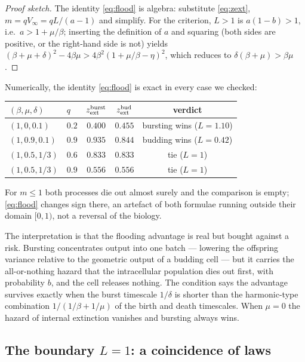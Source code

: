 \begin{proof}[Proof sketch]
The identity \eqref{eq:flood} is algebra: substitute \eqref{eq:zext},
$m=qV_\infty=qL/(a-1)$ and simplify. For the criterion, $L>1$ is
$a(1-b)>1$, i.e.\ $a>1+\mu/\beta$; inserting the definition of $a$ and
squaring (both sides are positive, or the right-hand side is not) yields
$(\beta+\mu+\delta)^2-4\beta\mu>4\beta^2(1+\mu/\beta-\eta)^2$, which
reduces to $\delta(\beta+\mu)>\beta\mu$.
\end{proof}

Numerically, the identity \eqref{eq:flood} is exact in every case we
checked:
\begin{center}
\renewcommand{\arraystretch}{1.2}
\begin{tabular}{@{}llccc@{}}
\toprule
$(\beta,\mu,\delta)$ & $q$ & $z_{\rm ext}^{\rm burst}$ & $z_{\rm ext}^{\rm bud}$ & verdict \\
\midrule
$(1,0,0.1)$ & $0.2$ & $0.400$ & $0.455$ & bursting wins ($L=1.10$) \\
$(1,0.9,0.1)$ & $0.9$ & $0.935$ & $0.844$ & budding wins ($L=0.42$) \\
$(1,0.5,1/3)$ & $0.6$ & $0.833$ & $0.833$ & tie ($L=1$) \\
$(1,0.5,1/3)$ & $0.9$ & $0.556$ & $0.556$ & tie ($L=1$) \\
\bottomrule
\end{tabular}
\end{center}
For $m\le1$ both processes die out almost surely and the comparison is
empty; \eqref{eq:flood} changes sign there, an artefact of both formulae
running outside their domain $[0,1)$, not a reversal of the biology.

The interpretation is that the flooding advantage is real but bought
against a risk. Bursting concentrates output into one batch --- lowering
the offspring variance relative to the geometric output of a budding cell
--- but it carries the all-or-nothing hazard that the intracellular
population dies out first, with probability $b$, and the cell releases
nothing. The condition says the advantage survives exactly when the burst
timescale $1/\delta$ is shorter than the harmonic-type combination
$1/(1/\beta+1/\mu)$ of the birth and death timescales. When $\mu=0$ the
hazard of internal extinction vanishes and bursting always wins.

\subsection{The boundary $L=1$: a coincidence of laws}

